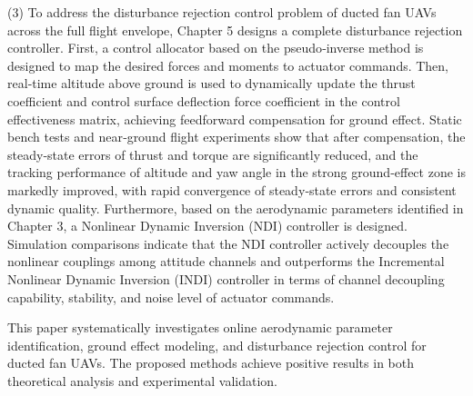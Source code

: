 (3) To address the disturbance rejection control problem of ducted fan UAVs across the full flight envelope, Chapter 5 designs a complete disturbance rejection controller. First, a control allocator based on the pseudo‑inverse method is designed to map the desired forces and moments to actuator commands. Then, real‑time altitude above ground is used to dynamically update the thrust coefficient and control surface deflection force coefficient in the control effectiveness matrix, achieving feedforward compensation for ground effect. Static bench tests and near‑ground flight experiments show that after compensation, the steady‑state errors of thrust and torque are significantly reduced, and the tracking performance of altitude and yaw angle in the strong ground‑effect zone is markedly improved, with rapid convergence of steady‑state errors and consistent dynamic quality. Furthermore, based on the aerodynamic parameters identified in Chapter 3, a Nonlinear Dynamic Inversion (NDI) controller is designed. Simulation comparisons indicate that the NDI controller actively decouples the nonlinear couplings among attitude channels and outperforms the Incremental Nonlinear Dynamic Inversion (INDI) controller in terms of channel decoupling capability, stability, and noise level of actuator commands.

This paper systematically investigates online aerodynamic parameter identification, ground effect modeling, and disturbance rejection control for ducted fan UAVs. The proposed methods achieve positive results in both theoretical analysis and experimental validation.


